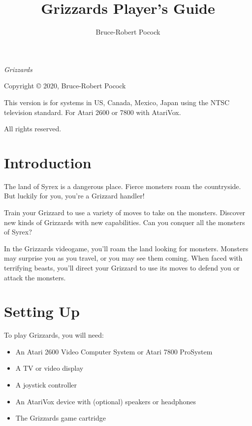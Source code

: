\documentclass[10pt,twoside,openright]{memoir}
\title{Grizzards Player's Guide}
\author{Bruce-Robert Pocock}
\makeatletter
\newcommand\TV{NTSC}
\newcommand\REGION{US, Canada, Mexico, Japan}
\newcommand\TV{PAL}
\newcommand\REGION{Europe (except France)}
\newcommand\TV{SECAM}
\newcommand\REGION{France, Russia, Africa}
\def\maketitle{%
  \null
  \thispagestyle{empty}%
  \vfill
  \begin{center}\leavevmode
    \normalfont
    {\LARGE\raggedleft \@author\par}%
    \hrulefill\par
    {\huge\raggedright \@title\par}%
    \vskip 1cm
  \end{center}%
  \vfill
  \null
  \cleardoublepage
  }
\makeatother
\begin{document}
\let\cleardoublepage\clearpage


\maketitle

\frontmatter

\null\vfill

\begin{flushleft}
\textit{Grizzards}


Copyright © 2020, Bruce-Robert Pocock

This version is for systems in \REGION{} using the \TV{} television
standard. For Atari 2600 or 7800 with AtariVox.




\thedate

\bigskip

All rights reserved.

\end{flushleft}
\let\cleardoublepage\clearpage

\mainmatter

\chapter{Introduction}

The land of Syrex is a dangerous place. Fierce monsters roam the countryside.
But luckily for you, you're a Grizzard handler!

Train your Grizzard to use a variety of moves to take on the monsters.
Discover new kinds of Grizzards with new capabilities. Can you conquer all
the monsters of Syrex?

In the Grizzards videogame, you'll roam the land looking for monsters.
Monsters may surprise you as you travel, or you may see them coming. When
faced with terrifying beasts, you'll direct your Grizzard to use its moves
to defend you or attack the monsters.


\chapter{Setting Up}

To play Grizzards, you will need:

\begin{itemize}
\item An Atari 2600 Video Computer System or Atari 7800 ProSystem
\item A TV or video display
\item A joystick controller
\item An AtariVox device with (optional) speakers or headphones
\item The Grizzards game cartridge
\end{itemize}
\end{document}
